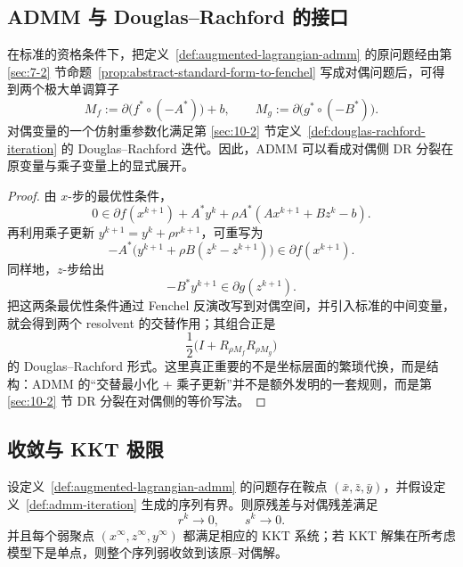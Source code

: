 \subsection{ADMM 与 Douglas--Rachford 的接口}

\begin{proposition}\label{prop:admm-as-dr-splitting}
在标准的资格条件下，把定义~\ref{def:augmented-lagrangian-admm} 的原问题经由第 \ref{sec:7-2} 节命题~\ref{prop:abstract-standard-form-to-fenchel} 写成对偶问题后，可得到两个极大单调算子
\[
M_f:=\partial\bigl(f^\ast\circ(-A^\ast)\bigr)+b,
\qquad
M_g:=\partial\bigl(g^\ast\circ(-B^\ast)\bigr).
\]
对偶变量的一个仿射重参数化满足第 \ref{sec:10-2} 节定义~\ref{def:douglas-rachford-iteration} 的 Douglas--Rachford 迭代。因此，ADMM 可以看成对偶侧 DR 分裂在原变量与乘子变量上的显式展开。
\end{proposition}

\begin{proof}
由 $x$-步的最优性条件，
\[
0\in \partial f(x^{k+1})+A^\ast y^k+\rho A^\ast(Ax^{k+1}+Bz^k-b).
\]
再利用乘子更新 $y^{k+1}=y^k+\rho r^{k+1}$，可重写为
\[
-A^\ast\bigl(y^{k+1}+\rho B(z^k-z^{k+1})\bigr)\in \partial f(x^{k+1}).
\]
同样地，$z$-步给出
\[
-B^\ast y^{k+1}\in \partial g(z^{k+1}).
\]
把这两条最优性条件通过 Fenchel 反演改写到对偶空间，并引入标准的中间变量，就会得到两个 resolvent 的交替作用；其组合正是
\[
\frac12\bigl(I+R_{\rho M_f}R_{\rho M_g}\bigr)
\]
的 Douglas--Rachford 形式。这里真正重要的不是坐标层面的繁琐代换，而是结构：ADMM 的“交替最小化 + 乘子更新”并不是额外发明的一套规则，而是第 \ref{sec:10-2} 节 DR 分裂在对偶侧的等价写法。
\end{proof}

\subsection{收敛与 KKT 极限}

\begin{theorem}\label{thm:admm-primal-dual-convergence}
设定义~\ref{def:augmented-lagrangian-admm} 的问题存在鞍点 $(\bar x,\bar z,\bar y)$，并假设定义~\ref{def:admm-iteration} 生成的序列有界。则原残差与对偶残差满足
\[
r^k\to 0,
\qquad
s^k\to 0.
\]
并且每个弱聚点 $(x^\infty,z^\infty,y^\infty)$ 都满足相应的 KKT 系统；若 KKT 解集在所考虑模型下是单点，则整个序列弱收敛到该原--对偶解。
\end{theorem}

